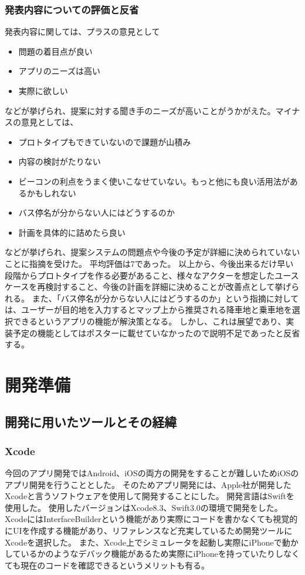 \documentclass[openany,11pt,papersize]{jsbook}
\begin{document}

\subsection{発表内容についての評価と反省}
発表内容に関しては、プラスの意見として
\begin{itemize}

\item 問題の着目点が良い
\item アプリのニーズは高い
\item 実際に欲しい

\end{itemize}
などが挙げられ、提案に対する聞き手のニーズが高いことがうかがえた。マイナスの意見としては、
\begin{itemize}

\item プロトタイプもできていないので課題が山積み
\item 内容の検討がたりない
\item ビーコンの利点をうまく使いこなせていない。もっと他にも良い活用法があるかもしれない
\item バス停名が分からない人にはどうするのか
\item 計画を具体的に詰めたら良い

\end{itemize}
などが挙げられ、提案システムの問題点や今後の予定が詳細に決められていないことに指摘を受けた。
平均評価は7であった。
以上から、今後出来るだけ早い段階からプロトタイプを作る必要があること、様々なアクターを想定したユースケースを再検討すること、今後の計画を詳細に決めることが改善点として挙げられる。
また、「バス停名が分からない人にはどうするのか」という指摘に対しては、ユーザーが目的地を入力するとマップ上から推奨される降車地と乗車地を選択できるというアプリの機能が解決策となる。
しかし、これは展望であり、実装予定の機能としてはポスターに載せていなかったので説明不足であったと反省する。



\chapter{開発準備}
\section{開発に用いたツールとその経緯}
\subsection{Xcode}
今回のアプリ開発ではAndroid、iOSの両方の開発をすることが難しいためiOSのアプリ開発を行うこととした。
そのためアプリ開発には、Apple社が開発したXcodeと言うソフトウェアを使用して開発することにした。
開発言語はSwiftを使用した。
使用したバージョンはXcode8.3、Swift3.0の環境で開発をした。
XcodeにはInterfaceBuilderという機能があり実際にコードを書かなくても視覚的にUIを作成する機能があり、リファレンスなど充実しているため開発ツールにXcodeを選択した。
また、Xcode上でシミュレータを起動し実際にiPhoneで動かしているかのようなデバック機能があるため実際にiPhoneを持っていたりしなくても現在のコードを確認できるというメリットも有る。
\end{document}
